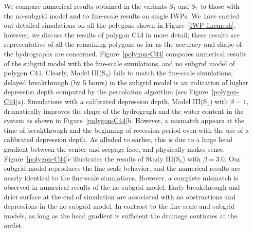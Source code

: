 We compare numerical results obtained in the variants S$_1$ and S$_2$ to those with the no-subgrid model and to fine-scale results on single IWPs. We have carried out detailed simulations on all the polygons shown in Figure~\ref{IWP-finemesh}, however, we discuss the results of polygon C44 in more detail; these results are representative of all the remaining polygons as far as the accuracy and shape of the hydrographs are concerned. 
Figure~\ref{polygon-C44} compares numerical results of the subgrid model with the fine-scale simulations, and no subgrid model of polygon C44. 
Clearly, Model III(S$_2$) fails to match the fine-scale simulations, delayed breakthrough (by 5 hours) in the subgrid model is an indication of higher depression depth computed by the percolation algorithm (see Figure~\ref{polygon-C44}a). 
Simulations with a calibrated depression depth, Model III(S$_1$) with $\beta = 1$, dramatically improves the shape of the hydrogragh and the water content in the system as shown in Figure~\ref{polygon-C44}b. 
However, a mismatch appears at the time of breakthrough and the beginning of recession period even with the use of a calibrated depression depth. 
As alluded to earlier, this is due to a large head gradient between the center and seepage face, and physically makes sense. 
Figure~\ref{polygon-C44}c illustrates the results of Study III(S$_1$) with $\beta = 3.0$.
Our subgrid model reproduces the fine-scale behavior, and the numerical results are nearly identical to the fine-scale simulations. 
However, a complete mismatch is observed in numerical results of the no-subgrid model. Early breakthrough and drier surface at the end of simulation are associated with no obstructions and depressions in the no-subgrid model. 
In contrast to the fine-scale and subgrid models, as long as the head gradient is sufficient the drainage continues at the outlet.


